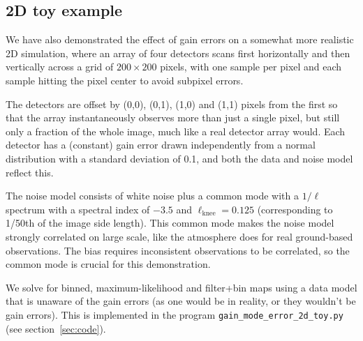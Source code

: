 \documentclass[twocolumn,apj]{aastex63}
\begin{document}
\subsection{2D toy example}
We have also demonstrated the effect of gain errors on a somewhat more realistic
2D simulation, where an array of four detectors scans first horizontally and then vertically
across a grid of $200\times200$ pixels, with one sample per pixel and each sample
hitting the pixel center to avoid subpixel errors.

The detectors are offset by
(0,0), (0,1), (1,0) and (1,1) pixels from the first so that the array instantaneously
observes more than just a single pixel, but still only a fraction of the whole image, much like
a real detector array would. Each detector has a (constant) gain error drawn
independently from a normal distribution with a standard deviation of 0.1, and both the
data and noise model reflect this.

The noise model consists of white noise plus a
common mode with a $1/\ell$ spectrum with a spectral index of $-3.5$ and $\ell_\text{knee} = 0.125$
(corresponding to 1/50th of the image side length). This common mode makes the noise model
strongly correlated on large scale, like the atmosphere does for real ground-based observations.
The bias requires inconsistent observations to be correlated, so the common mode is crucial for
this demonstration.

We solve for binned, maximum-likelihood and filter+bin
maps using a data model that is unaware of the gain errors (as one would be in reality,
or they wouldn't be gain errors). This is implemented in the program \verb|gain_mode_error_2d_toy.py|
(see section~\ref{sec:code}).
\end{document}

